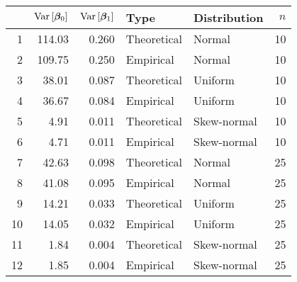 \begin{table}[ht]
\centering
\begin{tabular}{rrrllr}
  \hline
 & $\text{Var}\left[\boldsymbol{\beta}_0\right]$ & $\text{Var}\left[\boldsymbol{\beta}_1\right]$ & Type & Distribution & $n$ \\ 
  \hline
1 & 114.03 & 0.260 & Theoretical & Normal & 10 \\ 
  2 & 109.75 & 0.250 & Empirical & Normal & 10 \\ 
  3 & 38.01 & 0.087 & Theoretical & Uniform & 10 \\ 
  4 & 36.67 & 0.084 & Empirical & Uniform & 10 \\ 
  5 & 4.91 & 0.011 & Theoretical & Skew-normal & 10 \\ 
  6 & 4.71 & 0.011 & Empirical & Skew-normal & 10 \\ 
  7 & 42.63 & 0.098 & Theoretical & Normal & 25 \\ 
  8 & 41.08 & 0.095 & Empirical & Normal & 25 \\ 
  9 & 14.21 & 0.033 & Theoretical & Uniform & 25 \\ 
  10 & 14.05 & 0.032 & Empirical & Uniform & 25 \\ 
  11 & 1.84 & 0.004 & Theoretical & Skew-normal & 25 \\ 
  12 & 1.85 & 0.004 & Empirical & Skew-normal & 25 \\ 
   \hline
\end{tabular}
\end{table}
